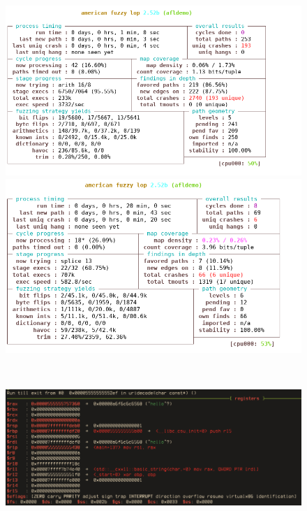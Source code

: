 \documentclass[../main.tex]{subfiles}
\begin{document}
\begin{figure}[htp]
\centering
\begin{minipage}{.5\textwidth}
  \centering
  \includegraphics[scale=0.4]{images/afl-test_x86_64-white.png}
\end{minipage}%
\begin{minipage}{.5\textwidth}
  \centering
  \vspace*{-0.033in}
  \includegraphics[scale=0.4]{images/afl-test_qemu.png}
\end{minipage}\\
\begin{minipage}{.5\textwidth}
  \includegraphics[scale=0.48]{images/gdb_afl-test_unicorn.png}

\end{minipage}
\end{figure}
\end{document}
